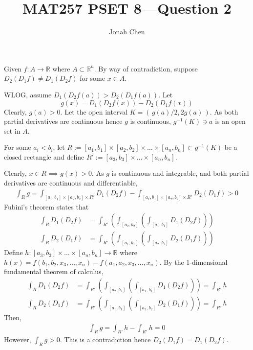 \documentclass{exam}
\title{MAT257 PSET 8---Question 2}
\author{Jonah Chen}
\date{}
\numberwithin{equation}{section}
\newcommand{\R}{\mathbb{R}}
\begin{document}
    \sffamily
    \maketitle
    Given $f:A\to\R$ where $A\subset\R^n$. By way of contradiction, suppose $D_2(D_1f)\neq D_1(D_2f)$ for some $x\in A$. 
    
    WLOG, assume $D_1(D_2f(a))>D_2(D_1f(a))$. Let $$g(x)=D_1(D_2f(x))-D_2(D_1f(x))$$
    Clearly, $g(a)>0$. Let the open interval $K=(\,g(a)/2,2g(a)\,)$. As both partial derivatives are continuous hence $g$ is continuous, $g^{-1}(K)\ni a$ is an open set in $A$. 
    
    For some $a_i<b_i$, let $R:=[a_1,b_1]\times[a_2,b_2]\times\dots\times[a_n,b_n]\subset g^{-1}(K)$ be a closed rectangle and define $R':=[a_3,b_3]\times\dots\times[a_n,b_n]$.
    
    Clearly, $x\in R\implies g(x)>0$. As $g$ is continuous and integrable, and both partial derivatives are continuous and differentiable,
    \begin{align*}
        \int_Rg=\int_{[a_1,b_1]\times[a_2,b_2]\times R'}D_{1}(D_2f)-\int_{[a_1,b_1]\times[a_2,b_2]\times R'}D_2(D_1f)>0
    \end{align*}
    Fubini's theorem states that
    \begin{align*}
        \int_RD_1(D_2f)&=\int_{R'}\left(\int_{[a_2,b_2]}\left(\int_{[a_1,b_1]}D_1(D_2f)\right)\right)\\
        \int_RD_2(D_1f)&=\int_{R'}\left(\int_{[a_1,b_1]}\left(\int_{[a_2,b_2]}D_2(D_1f)\right)\right)
    \end{align*}
    Define $h:[a_3,b_3]\times\dots\times[a_n,b_n]\to\R$ where $h(x)=f(b_1,b_2,x_3,\dots,x_n)-f(a_1,a_2,x_3,\dots,x_n)$. By the 1-dimensional fundamental theorem of calculus,
    \begin{align*}
        \int_RD_1(D_2f)&=\int_{R'}\left(\int_{[a_2,b_2]}\left(\int_{[a_1,b_1]}D_1(D_2f)\right)\right)=\int_{R'}h\\
        \int_RD_2(D_1f)&=\int_{R'}\left(\int_{[a_1,b_1]}\left(\int_{[a_2,b_2]}D_2(D_1f)\right)\right)=\int_{R'}h
    \end{align*}
    Then, 
    \begin{align*}
        \int_Rg=\int_{R'}h-\int_{R'}h=0
    \end{align*}
    However, $\int_Rg>0$. This is a contradiction hence $D_2(D_1f)=D_1(D_2f)$.
\end{document}
